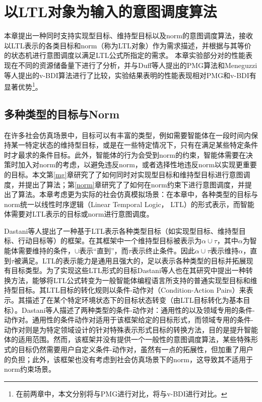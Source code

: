 \chapter{以LTL对象为输入的意图调度算法}\label{ltl}
本章提出一种同时支持实现型目标、维持型目标以及norm的意图调度算法\SAT ，\SAT 接收以LTL表示的各类目标和norm（称为LTL对象）作为需求描述，并根据与其等价的状态机进行意图调度以满足LTL公式所指定的需求。 本章实验部分对\SAT 的性能表现在不同的资源储备量下进行了分析，并与Duff等人提出的PMG\cite{DBLP:conf/atal/DuffHT06}算法和Meneguzzi等人提出的v-BDI算法\cite{DBLP:journals/eaai/MeneguzziROVL15}进行了比较，实验结果表明\SAT 的性能表现相对PMG和v-BDI有显著优势\footnote{在前两章中，本文分别将\SAM 与PMG进行对比，将\SAN 与v-BDI进行对比。}。
\section{多种类型的目标与Norm}
在许多社会仿真场景中，目标可以有丰富的类型，例如需要智能体在一段时间内保持某一特定状态的维持型目标，或是在一些特定情况下，只有在满足某些特定条件时才最求的条件目标。此外，智能体的行为会受到norm的约束，智能体需要在决策时加入对norm的考虑，以避免违反norm，或者选择性地违反norm以实现更重要的目标。本文第\ref{mg}章研究了了如何同时对实现型目标和维持型目标进行意图调度，并提出了\SAM 算法；第\ref{norm}章研究了了如何在norm约束下进行意图调度，并提出了\SAN 算法。本章考虑更为实际的社会仿真模拟场景：在本章中，各种类型的目标与norm统一以线性时序逻辑（Linear Temporal Logic， LTL）的形式表示，而智能体需要对LTL表示的目标或norm进行意图调度。

Dastani等人\cite{DBLP:conf/atal/DastaniRW11}提出了一种基于LTL表示各种类型目标（如实现型目标、维持型目标、行动目标等）的框架。在其框架中一个维持型目标被表示为$\alpha \cup \tau$，其中$\alpha$为智能体需要维持的条件，$\cup$表示“直到”，而$\tau$表示终止条件。因此$\alpha \cup \tau$表示维持$\alpha$，直到$\tau$被满足。LTL的表示能力是通用且强大的，足以表示各种类型的目标并拓展现有目标类型。为了实现这些LTL形式的目标Dastani等人也在其研究中提出一种转换方法，能够将LTL公式转变为一般智能体编程语言所支持的普通实现型目标和维持型目标。其LTL目标的转化规则以条件-动作对（Condition-Action Pairs）来表示。其描述了在某个特定环境状态下的目标状态转变（由LTL目标转化为基本目标）。Dastani等人\cite{DBLP:conf/atal/DastaniRW11}描述了两种类型的条件-动作对：通用性的以及领域专用的条件-动作对。通用性的条件动作对适用于该框架给定的目标形式，而领域专用的条件-动作对则是为特定领域设计的针对特殊表示形式目标的转换方法，目的是提升智能体的适用范围。然而，该框架并没有提供一个一般性的意图调度算法，某些特殊形式的目标仍然需要用户自定义条件-动作对，虽然有一点的拓展性，但加重了用户的负担；此外，该框架也没有考虑到社会仿真场景下的norm，这导致其不适用于norm约束场景。

